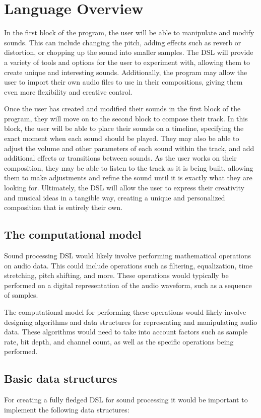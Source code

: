 \chapter{Language Overview}

In the first block of the program, the user will be able to manipulate and modify sounds. This can include changing the pitch, adding effects such as reverb or distortion, or chopping up the sound into smaller samples. The DSL will provide a variety of tools and options for the user to experiment with, allowing them to create unique and interesting sounds. Additionally, the program may allow the user to import their own audio files to use in their compositions, giving them even more flexibility and creative control.

Once the user has created and modified their sounds in the first block of the program, they will move on to the second block to compose their track. In this block, the user will be able to place their sounds on a timeline, specifying the exact moment when each sound should be played. They may also be able to adjust the volume and other parameters of each sound within the track, and add additional effects or transitions between sounds. As the user works on their composition, they may be able to listen to the track as it is being built, allowing them to make adjustments and refine the sound until it is exactly what they are looking for. Ultimately, the DSL will allow the user to express their creativity and musical ideas in a tangible way, creating a unique and personalized composition that is entirely their own.

\section{The computational model}
Sound processing DSL would likely involve performing 
mathematical operations on audio data. This could include 
operations such as filtering, equalization, time stretching, pitch 
shifting, and more. These operations would typically be performed 
on a digital representation of the audio waveform, such as a 
sequence of samples.

The computational model for performing these operations would 
likely involve designing algorithms and data structures for 
representing and manipulating audio data. These algorithms would 
need to take into account factors such as sample rate, bit depth, 
and channel count, as well as the specific operations being 
performed.

\section{Basic data structures}
For creating a fully fledged DSL for sound processing it would be important to implement the following data structures: 

